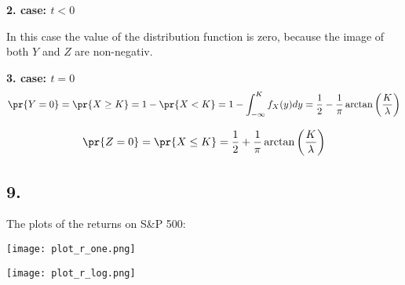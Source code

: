   \textbf{2. case: $t<0$}
  
  In this case the value of the distribution function is zero, because the image of both $Y$ and $Z$ are non-negativ. 
  
  \textbf{3. case: $t=0$}
  $$\pr{Y=0}=\pr{X\ge K}=1-\pr{X<K}= 1- \int_{-\infty}^{K} f_X(y) dy =\frac{1}{2} - \frac{1}{\pi} \arctan\left(\frac{K}{\lambda}\right)$$
  
  $$\pr{Z=0}=\pr{X\le K}= \frac{1}{2} + \frac{1}{\pi} \arctan\left(\frac{K}{\lambda}\right)$$
  
  
  
 
 \newpage
\subsection*{9.}
The plots of the returns on S\&P 500:
\begin{center}
\texttt{[image: plot\_r\_one.png]}
\end{center}
\begin{center}
\texttt{[image: plot\_r\_log.png]}  
\end{center}
